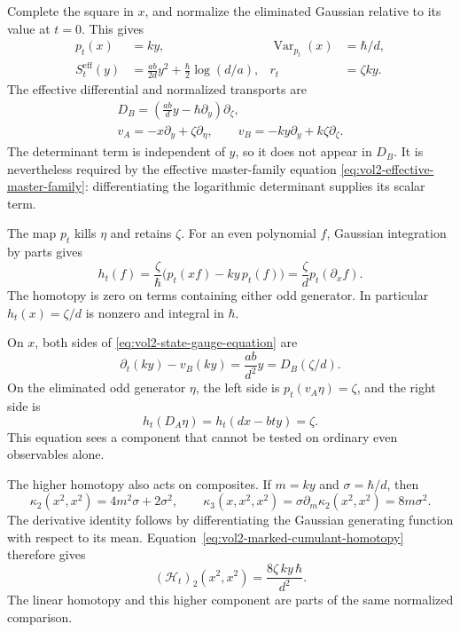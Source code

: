 Complete the square in $x$, and normalize the eliminated
Gaussian relative to its value at $t=0$. This gives
\begin{equation}\label{eq:vol2-shear-state}
 \begin{aligned}
 p_t(x)&=ky,&
 \operatorname{Var}_{p_t}(x)&=\hbar/d,\\
 S_t^{\mathrm{eff}}(y)
   &=\frac{ab}{2d}y^2+\frac{\hbar}{2}\log(d/a),&
 r_t&=\zeta ky.
 \end{aligned}
\end{equation}
The effective differential and normalized transports are
\begin{equation}\label{eq:vol2-shear-transports}
 \begin{gathered}
 D_B=\left(\frac{ab}{d}y-\hbar\partial_y\right)\partial_\zeta,\\
 v_A=-x\partial_y+\zeta\partial_\eta,
 \qquad v_B=-ky\partial_y+k\zeta\partial_\zeta.
 \end{gathered}
\end{equation}
The determinant term is independent of $y$, so it does
not appear in $D_B$. It is nevertheless required by the
effective master-family equation
\eqref{eq:vol2-effective-master-family}: differentiating
the logarithmic determinant supplies its scalar term.

The map $p_t$ kills $\eta$ and retains $\zeta$.
For an even polynomial $f$, Gaussian integration by parts
gives
\begin{equation}\label{eq:vol2-shear-homotopy}
 h_t(f)=\frac{\zeta}{\hbar}
              \bigl(p_t(xf)-ky\,p_t(f)\bigr)
                  =\frac{\zeta}{d}p_t(\partial_xf).
\end{equation}
The homotopy is zero on terms containing either odd
generator. In particular $h_t(x)=\zeta/d$ is nonzero
and integral in $\hbar$.

On $x$, both sides of
\eqref{eq:vol2-state-gauge-equation} are
\[
 \partial_t(ky)-v_B(ky)=\frac{ab}{d^2}y
                       =D_B(\zeta/d).
\]
On the eliminated odd generator $\eta$, the left side
is $p_t(v_A\eta)=\zeta$, and the right side is
\[
 h_t(D_A\eta)=h_t(dx-bty)=\zeta.
\]
This equation sees a component that cannot be tested on
ordinary even observables alone.

The higher homotopy also acts on composites. If
$m=ky$ and $\sigma=\hbar/d$, then
\[
 \kappa_2(x^2,x^2)=4m^2\sigma+2\sigma^2,
 \qquad
 \kappa_3(x,x^2,x^2)=\sigma\partial_m\kappa_2(x^2,x^2)
                              =8m\sigma^2.
\]
The derivative identity follows by differentiating
the Gaussian generating function with respect to its mean.
Equation~\eqref{eq:vol2-marked-cumulant-homotopy} therefore
gives
\begin{equation}\label{eq:vol2-shear-higher-component}
 (\mathcal H_t)_2(x^2,x^2)
                         =\frac{8\zeta\,ky\,\hbar}{d^2}.
\end{equation}
The linear homotopy and this higher component are parts
of the same normalized comparison.

